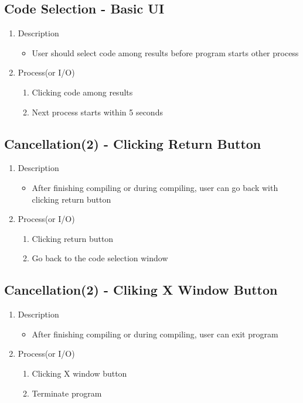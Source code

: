\documentclass[conference]{IEEEtran}
\begin{document}
\subsection{Code Selection - Basic UI}

\begin{enumerate}
  \item Description
  \begin{itemize}
    \item User should select code among results before program starts other process
  \end{itemize}
  \item Process(or I/O)
  \begin{enumerate}
    \item Clicking code among results
    \item Next process starts within 5 seconds
  \end{enumerate}
\end{enumerate}


\textit{}

\subsection{Cancellation(2) - Clicking Return Button}
\begin{enumerate}
  \item Description
  \begin{itemize}
    \item After finishing compiling or during compiling, user can go back with clicking return button
  \end{itemize}
  \item Process(or I/O)
  \begin{enumerate}
    \item Clicking return button
    \item Go back to the code selection window
  \end{enumerate}
\end{enumerate}
\textit{}


\subsection{Cancellation(2) - Cliking X Window Button}
\begin{enumerate}
  \item Description
  \begin{itemize}
    \item After finishing compiling or during compiling, user can exit program
  \end{itemize}
  \item Process(or I/O)
  \begin{enumerate}
    \item Clicking X window button
    \item Terminate program
  \end{enumerate}
\end{enumerate}
\textit{}
\end{document}
